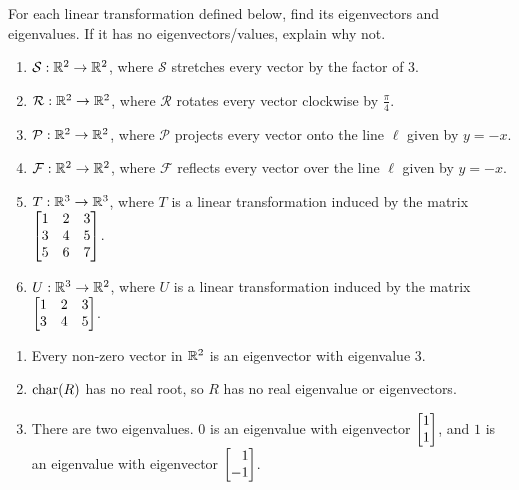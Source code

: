 
\begin{exercises}

	\begin{problist}
		\prob For each linear transformation defined below, find its eigenvectors
		and eigenvalues. If it has no eigenvectors/values, explain why not.
		\begin{enumerate}
			\item $\mathcal S:\mathbb{R}^{2}\to\mathbb{R}^{2}$, where $\mathcal S$ stretches
				every vector by the factor of $3$.

			\item $\mathcal R:\mathbb{R}^{2}\to\mathbb{R}^{2}$, where $\mathcal R$ rotates
				every vector clockwise by $\frac{\pi}{4}$.

			\item $\mathcal P:\mathbb{R}^{2}\to\mathbb{R}^{2}$, where $\mathcal P$ projects
				every vector onto the line $\ell$ given by $y=-x$.

			\item $\mathcal F:\mathbb{R}^{2}\to\mathbb{R}^{2}$, where $\mathcal F$ reflects
				every vector over the line $\ell$ given by $y=-x$.

			\item $T:\mathbb{R}^{3}\to\mathbb{R}^{3}$, where $T$ is a linear transformation
				induced by the matrix $\mat{1&2&3\\3&4&5\\5&6&7}$.

			\item $U:\mathbb{R}^{3}\to\mathbb{R}^{2}$, where $U$ is a linear transformation
				induced by the matrix $\mat{1&2&3\\3&4&5}$.
		\end{enumerate}


		\begin{solution}

			\begin{enumerate}
				\item Every non-zero vector in $\mathbb{R}^{2}$ is an eigenvector with
					eigenvalue 3.

				\item $\operatorname{char}(R)$ has no real root, so $R$ has no real eigenvalue
					or eigenvectors.

				\item There are two eigenvalues. $0$ is an eigenvalue with
					eigenvector $\mat{1 \\ 1}$, and $1$ is an
					eigenvalue with eigenvector $\mat{1\\-1}$.


\end{enumerate}
\end{solution}
\end{problist}
\end{exercises}

